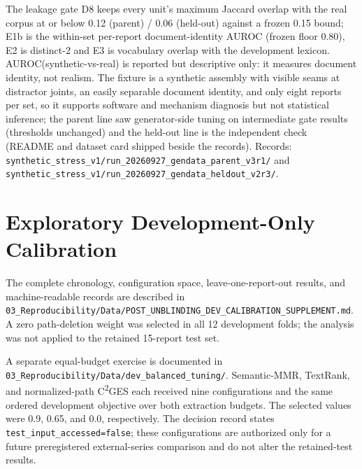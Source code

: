 \documentclass[11pt]{article}
\newcommand{\cges}{C\textsuperscript{2}GES}
\begin{document}
The leakage gate D8 keeps every unit's maximum Jaccard overlap with the real corpus at or below 0.12 (parent) / 0.06 (held-out) against a frozen 0.15 bound; E1b is the within-set per-report document-identity AUROC (frozen floor 0.80), E2 is distinct-2 and E3 is vocabulary overlap with the development lexicon. AUROC(synthetic-vs-real) is reported but descriptive only: it measures document identity, not realism. The fixture is a synthetic assembly with visible seams at distractor joints, an easily separable document identity, and only eight reports per set, so it supports software and mechanism diagnosis but not statistical inference; the parent line saw generator-side tuning on intermediate gate results (thresholds unchanged) and the held-out line is the independent check (README and dataset card shipped beside the records). Records: \nolinkurl{synthetic\_stress\_v1/run\_20260927\_gendata\_parent\_v3r1/} and \nolinkurl{synthetic\_stress\_v1/run\_20260927\_gendata\_heldout\_v2r3/}.



\section*{Exploratory Development-Only Calibration}

The complete chronology, configuration space, leave-one-report-out results, and machine-readable records are described in \nolinkurl{03_Reproducibility/Data/POST_UNBLINDING_DEV_CALIBRATION_SUPPLEMENT.md}. A zero path-deletion weight was selected in all 12 development folds; the analysis was not applied to the retained 15-report test set.

A separate equal-budget exercise is documented in \nolinkurl{03_Reproducibility/Data/dev_balanced_tuning/}. Semantic-MMR, TextRank, and normalized-path \cges{} each received nine configurations and the same ordered development objective over both extraction budgets. The selected values were 0.9, 0.65, and 0.0, respectively. The decision record states \nolinkurl{test_input_accessed=false}; these configurations are authorized only for a future preregistered external-series comparison and do not alter the retained-test results.
\end{document}
